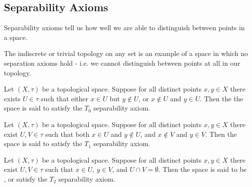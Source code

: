 \documentclass[12pt, a4paper, oneside, openright, titlepage]{book}
\begin{document}
\subsection{Separability Axioms}

\begin{remark}
    Separability axioms tell us how well we are able to distinguish between points in a space.
\end{remark}

\begin{example}
    The indiscrete or trivial topology on any set is an example of a space in which no separation axioms hold - i.e. we cannot distinguish between points at all in our topology.
\end{example}


\begin{definition}
    Let $(X,\tau)$ be a topological space. Suppose for all distinct points $x,y \in X$ there exists $U \in \tau$ such that either $x \in U$ but $y \notin U$, or $x \notin U$ and $y \in U$. Then the the space is said to satisfy the $T_0$ separability axiom.
\end{definition}


\begin{definition}
    Let $(X,\tau)$ be a topological space. Suppose for all distinct points $x,y \in X$ there exist $U,V \in \tau$ such that both $x \in U$ and $y \notin U$, and $x \notin V$ and $y \in V$. Then the space is said to satisfy the $T_1$ separability axiom.
\end{definition}


\begin{definition}
    Let $(X,\tau)$ be a topological space. Suppose for all distinct points $x,y \in X$ there exist $U,V \in \tau$ such that $x \in U$, $y \in V$, and $U\cap V = \emptyset$. Then the space is said to be , or satisfy the $T_2$ separability axiom.
\end{definition}
\end{document}
